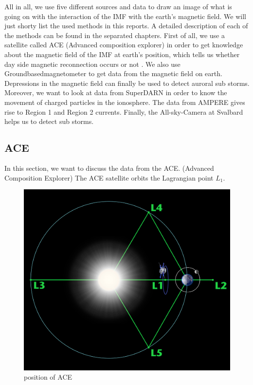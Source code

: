 \documentclass[10pt,a4paper]{article}
\begin{document}
All in all, we use five different sources and data to draw an image of what is going on with the interaction of the IMF with the earth's magnetic field. We will just shorty list the used methods in this reports. A detailed description of each of the methods can be found in the separated chapters. 
First of all, we use a satellite called ACE (Advanced composition explorer) in order to get knowledge about the magnetic field of the IMF at earth's position, which tells us whether day side magnetic reconnection occurs or not . 
We also use Groundbasedmagnetometer to get data from the magnetic field on earth. Depressions in the magnetic field can finally be used to detect auroral sub storms. 
Moreover, we want to look at data from SuperDARN in order to know the movement of charged particles in the ionosphere.
The data from AMPERE gives rise to Region 1 and Region 2 currents. 
Finally, the All-sky-Camera at Svalbard helps us to detect sub storms.  


\subsection{ACE \label{0_CHAPTER_ACE}}
In this section, we want to discuss the data from the ACE. (Advanced Composition Explorer)
The ACE satellite orbits the Lagrangian point $L_1$.
\begin{figure}[h]
\centering
\includegraphics[scale=0.06]{ACEposition.jpg}
\caption{position of ACE \cite{Link2} }
\label{position of ACE}
\end{figure}
\end{document}
